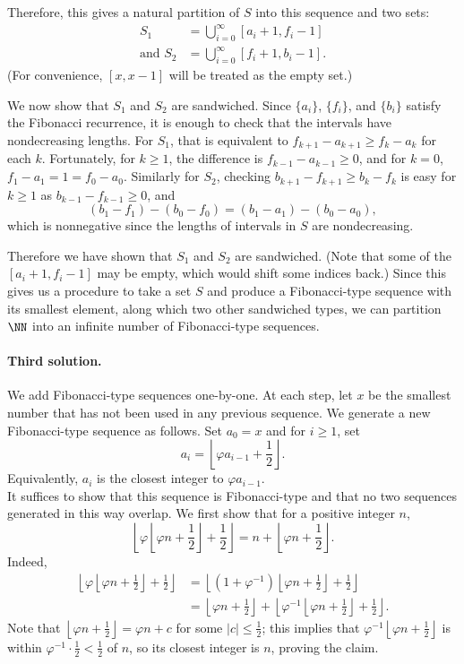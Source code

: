 Therefore, this gives a natural partition of $S$ into this sequence and two sets: \begin{align*} S_1 &= \bigcup_{i=0}^{\infty} [a_i+1,f_i-1] \\ \text{and} \,\, S_2 &= \bigcup_{i=0}^{\infty} [f_i+1,b_i-1].\end{align*} (For convenience, $[x,x-1]$ will be treated as the empty set.)

We now show that $S_1$ and $S_2$ are sandwiched. Since $\{a_i\}$, $\{f_i\}$, and $\{b_i\}$ satisfy the Fibonacci recurrence, it is enough to check that the intervals have nondecreasing lengths. For $S_1$, that is equivalent to $f_{k+1} - a_{k+1} \ge f_k - a_k$ for each $k$. Fortunately, for $k \ge 1$, the difference is $f_{k-1} - a_{k-1} \ge 0$, and for $k = 0$, $f_1 - a_1 = 1 = f_0 - a_0$. Similarly for $S_2$, checking $b_{k+1} - f_{k+1} \ge b_k - f_k$ is easy for $k \ge 1$ as $b_{k-1} - f_{k-1} \ge 0$, and \[(b_{1} - f_1) - (b_0 - f_0) = (b_1 - a_1) - (b_0 - a_0),\] which is nonnegative since the lengths of intervals in $S$ are nondecreasing.

Therefore we have shown that $S_1$ and $S_2$ are sandwiched. (Note that some of the $[a_i+1,f_i-1]$ may be empty, which would shift some indices back.) Since this gives us a procedure to take a set $S$ and produce a Fibonacci-type sequence with its smallest element, along which two other sandwiched types, we can partition $\NN$ into an infinite number of Fibonacci-type sequences.

\paragraph{Third solution.} We add Fibonacci-type sequences one-by-one. At each step, let $x$ be the smallest number that has not been used in any previous sequence. We generate a new Fibonacci-type sequence as follows. Set $a_0 = x$ and for $i \ge 1$, set \[a_i = \left \lfloor \varphi a_{i-1} + \frac{1}{2} \right \rfloor.\] Equivalently, $a_{i}$ is the closest integer to $\varphi a_{i-1}$. \\
It suffices to show that this sequence is Fibonacci-type and that no two sequences generated in this way overlap.
We first show that for a positive integer $n$, \[\left \lfloor \varphi \left \lfloor \varphi n + \frac{1}{2} \right \rfloor + \frac{1}{2} \right \rfloor = n + \left \lfloor \varphi n + \frac{1}{2} \right \rfloor . \]
Indeed, \begin{align*} \left \lfloor \varphi \left \lfloor \varphi n + \frac{1}{2} \right \rfloor + \frac{1}{2} \right \rfloor &= \left \lfloor (1 + \varphi^{-1}) \left \lfloor \varphi n + \frac{1}{2} \right \rfloor + \frac{1}{2}\right \rfloor \\
&= \left \lfloor \varphi n + \frac{1}{2} \right \rfloor + \left \lfloor \varphi^{-1} \left \lfloor \varphi n + \frac{1}{2}\right \rfloor + \frac{1}{2} \right \rfloor.
\end{align*}
Note that $\left \lfloor \varphi n + \frac{1}{2} \right \rfloor = \varphi n + c$ for some $|c| \le \frac{1}{2}$; this implies that $\varphi^{-1}\left \lfloor \varphi n + \frac{1}{2} \right \rfloor$ is within $\varphi^{-1}\cdot \frac{1}{2} < \frac{1}{2}$ of $n$, so its closest integer is $n$, proving the claim.

